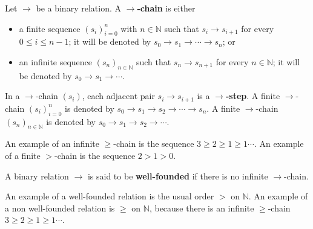\begin{definition}
    \label{def:binary_relation:chain} 
    Let \(\to\) be a binary relation. 
    A \textbf{\(\to\)-chain} is either
      \begin{itemize}
          \item a finite sequence \((s_i)_{i=0}^n\) with \(n \in \mathbb{N}\) such that \(s_i \to s_{i+1}\) for every \(0 \leq i \leq n-1\); it will be denoted by \(s_0 \to s_1 \to \cdots \to s_n\); or
          \item an infinite sequence \((s_n)_{n \in \mathbb{N}}\) such that \(s_n \to s_{n+1}\) for every \(n \in \mathbb{N}\); it will be denoted by \(s_0 \to s_1 \to \cdots\).
      \end{itemize}
      In a \(\to\)-chain \((s_i)\), each adjacent pair \(s_i \to s_{i+1}\) is a \textbf{\(\to\)-step}.
      A finite \(\to\)-chain \((s_i)_{i=0}^n\) is denoted by \(s_0 \to s_1 \to s_2 \to \cdots \to s_n \). 
      A finite \(\to\)-chain \((s_n)_{n \in \mathbb{N}}\) is denoted by \(s_0 \to s_1 \to s_2 \to \cdots \).

\end{definition}
An example of an infinite \(\geq\)-chain is the sequence \(3 \geq 2 \geq 1 \geq 1 \cdots\). An example of a finite \(>\)-chain is the sequence \(2 > 1 > 0\).
\begin{definition} 
    \label{def:binary_relation:well_founded}
    A binary relation $\to$ is said to be \textbf{well-founded} if there is no infinite $\to$-chain. 
\end{definition}
An example of a well-founded relation is the usual order
\(>\) on \(\mathbb{N}\). An example of a non well-founded relation is \(\geq\) on \(\mathbb{N}\), because there is an infinite \(\geq\)-chain \(3 \geq 2 \geq 1 \geq 1 \cdots\).